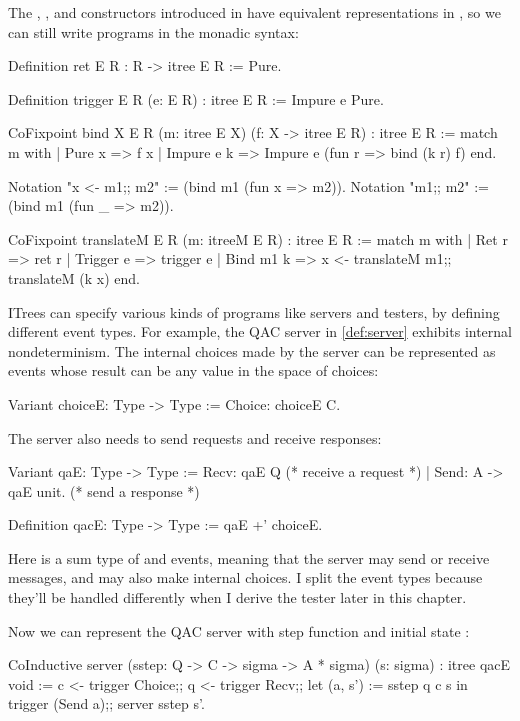 The , , and  constructors introduced in
 have equivalent representations in , so we can still
write programs in the monadic syntax:
\begin{coq}
  Definition ret {E R} : R -> itree E R := Pure.
  
  Definition trigger {E R} (e: E R) : itree E R := Impure e Pure.

  CoFixpoint bind {X E R} (m: itree E X) (f: X -> itree E R) : itree E R :=
    match m with
    | Pure   x   => f x
    | Impure e k => Impure e (fun r => bind (k r) f)
    end.

  Notation "x <- m1;; m2" := (bind m1 (fun x => m2)).
  Notation "m1;; m2"      := (bind m1 (fun _ => m2)).

  CoFixpoint translateM {E R} (m: itreeM E R) : itree E R :=
    match m with
    | Ret     r => ret r
    | Trigger e => trigger e
    | Bind m1 k => x <- translateM m1;; translateM (k x)
    end.
\end{coq}

ITrees can specify various kinds of programs like servers and testers, by
defining different event types.  For example, the QAC server in
\autoref{def:server} exhibits internal nondeterminism.  The internal choices
made by the server can be represented as  events whose result can be
any value in the space of choices:
\begin{coq}
  Variant choiceE: Type -> Type :=
    Choice: choiceE C.
\end{coq}

The server also needs to send requests and receive responses:
\begin{coq}
  Variant qaE: Type -> Type :=
    Recv: qaE Q           (* receive a request *)
  | Send: A -> qaE unit.  (* send a response   *)

  Definition qacE: Type -> Type := qaE +' choiceE.
\end{coq}

Here  is a sum type of  and  events, meaning
that the server may send or receive messages, and may also make internal
choices.  I split the event types because they'll be handled differently when I
derive the tester later in this chapter.

Now we can represent the QAC server with step function  and initial
state :
\begin{coq}
  CoInductive server (sstep: Q -> C -> sigma -> A * sigma) (s: sigma)
              : itree qacE void :=
    c <- trigger Choice;;
    q <- trigger Recv;;
    let (a, s') := sstep q c s in
    trigger (Send a);;
    server sstep s'.
\end{coq}

